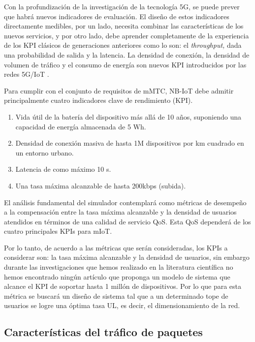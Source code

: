 Con la profundización de la investigación de la tecnología 5G, se puede prever que habrá nuevos indicadores de evaluación. El diseño de estos indicadores directamente medibles, por un lado, necesita combinar las características de los nuevos servicios, y por otro lado, debe aprender completamente de la experiencia de los KPI clásicos de generaciones anteriores como lo son: el \textit{throughput, }dada una\textit{ }probabilidad de salida y la latencia. La densidad de conexión, la densidad de volumen de tráfico y el consumo de energía son nuevos KPI introducidos por las redes 5G/IoT \parencite{WirelessSim}.\newline

Para cumplir con el conjunto de requisitos de mMTC, NB-IoT debe admitir principalmente cuatro indicadores clave de rendimiento (KPI).\newline

\begin{enumerate}
\item  Vida útil de la batería del dispositivo más allá de 10 años, suponiendo una capacidad de energía almacenada de 5 Wh.
\item  Densidad de conexión masiva de hasta 1M dispositivos por km cuadrado en un entorno urbano.
\item  Latencia de como máximo 10 s.
\item  Una tasa máxima alcanzable de hasta 200kbps (subida).
\end{enumerate}

El análisis fundamental del simulador contemplará como métricas de desempeño a la compensación entre la tasa máxima alcanzable y la densidad de usuarios atendidos en términos de una calidad de servicio QoS. Esta QoS dependerá de los cuatro principales KPIs para mIoT.\newline

Por lo tanto, de acuerdo a las métricas que serán consideradas, los KPIs a considerar son: la tasa máxima alcanzable y la densidad de usuarios, sin embargo durante las investigaciones que hemos realizado en la literatura científica no hemos encontrado ningún artículo que proponga un modelo de sistema que alcance el KPI de soportar hasta 1 millón de dispositivos. Por lo que para esta métrica se buscará un diseño de sistema tal que a un determinado tope de usuarios se logre una óptima tasa UL, es decir, el dimensionamiento de la red.

\subsection{Características del tráfico de paquetes}

